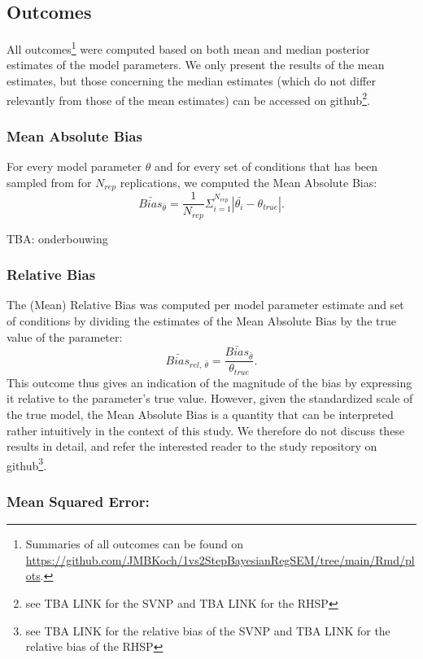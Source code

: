\documentclass[
  man, donotrepeattitle,floatsintext]{apa6}
\begin{document}
\hypertarget{outcomes}{%
\subsection{Outcomes}\label{outcomes}}

All outcomes\footnote{Summaries of all outcomes can be found on \url{https://github.com/JMBKoch/1vs2StepBayesianRegSEM/tree/main/Rmd/plots}.} were computed based on both mean and median posterior estimates of the model parameters. We only present the results of the mean estimates, but those concerning the median estimates (which do not differ relevantly from those of the mean estimates) can be accessed on github\footnote{see TBA LINK for the SVNP and TBA LINK for the RHSP}.

\hypertarget{mean-absolute-bias}{%
\subsubsection{Mean Absolute Bias}\label{mean-absolute-bias}}

For every model parameter \(\theta\) and for every set of conditions that has been sampled from for \(N_{rep}\) replications, we computed the Mean Absolute Bias:
\[\bar{Bias}_{\bar{\theta}} = \frac{1}{N_{rep}} \Sigma_{i = 1}^{N_{rep}} |\bar{\theta_i} - \theta_{true}|.\]

TBA: onderbouwing

\hypertarget{relative-bias}{%
\subsubsection{Relative Bias}\label{relative-bias}}

The (Mean) Relative Bias was computed per model parameter estimate and set of conditions by dividing the estimates of the Mean Absolute Bias by the true value of the parameter:
\[\bar{Bias}_{rel, \ \bar{\theta} } = \frac{\bar{Bias}_{\bar{\theta}}}{\theta_{true} }.\]
This outcome thus gives an indication of the magnitude of the bias by expressing it relative to the parameter's true value. However, given the standardized scale of the true model, the Mean Absolute Bias is a quantity that can be interpreted rather intuitively in the context of this study. We therefore do not discuss these results in detail, and refer the interested reader to the study repository on github\footnote{see TBA LINK for the relative bias of the SVNP and TBA LINK for the relative bias of the RHSP}.

\hypertarget{mean-squared-error}{%
\subsubsection{Mean Squared Error:}\label{mean-squared-error}}
\end{document}
